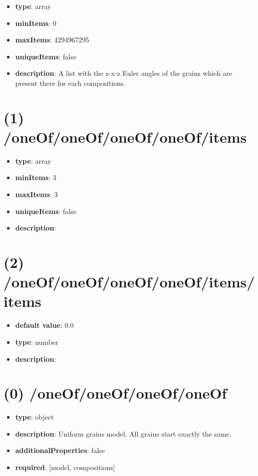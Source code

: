 \begin{itemize}[leftmargin=0em]\item {\bf type}: array
\item {\bf minItems}: 0
\item {\bf maxItems}: 4294967295
\item {\bf uniqueItems}: false
\item {\bf description}: A list with the z-x-z Euler angles of the grains which are present there for each compositions.
\end{itemize}\section{(1) /oneOf/oneOf/oneOf/oneOf/items}
\begin{itemize}[leftmargin=1em]\item {\bf type}: array
\item {\bf minItems}: 3
\item {\bf maxItems}: 3
\item {\bf uniqueItems}: false
\item {\bf description}: 
\end{itemize}\section{(2) /oneOf/oneOf/oneOf/oneOf/items/items}
\begin{itemize}[leftmargin=2em]\item {\bf default value}: 0.0
\item {\bf type}: number
\item {\bf description}: 
\end{itemize}\section{(0) /oneOf/oneOf/oneOf/oneOf}
\begin{itemize}[leftmargin=0em]\item {\bf type}: object
\item {\bf description}: Uniform grains model. All grains start exactly the same.
\item {\bf additionalProperties}: false
\item {\bf required}: [model, compositions]\end{itemize}
